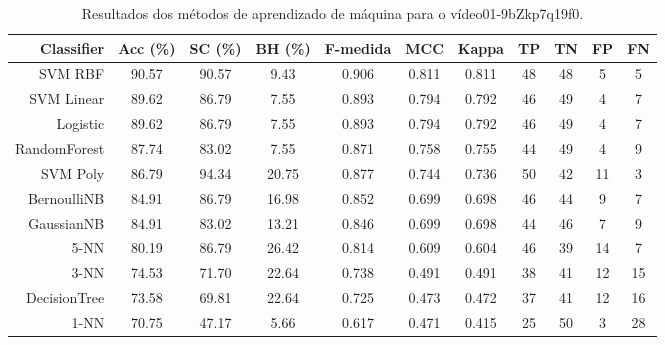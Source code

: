 \begin{table}[!htb]
\centering
\caption{Resultados dos métodos de aprendizado de máquina para o vídeo01-9bZkp7q19f0.}
\label{tab:01-9bZkp7q19f0}
\begin{tabular}{r|c|c|c|c|c|c|c|c|c|c}
\hline\hline
Classifier & Acc (\%) & SC (\%) & BH (\%) & F-medida & MCC & Kappa & TP & TN & FP & FN \\ \hline
SVM RBF & 90.57 & 90.57 & 9.43 & 0.906 & 0.811 & 0.811 & 48 & 48 & 5 & 5 \\ 
SVM Linear & 89.62 & 86.79 & 7.55 & 0.893 & 0.794 & 0.792 & 46 & 49 & 4 & 7 \\ 
Logistic & 89.62 & 86.79 & 7.55 & 0.893 & 0.794 & 0.792 & 46 & 49 & 4 & 7 \\ 
RandomForest & 87.74 & 83.02 & 7.55 & 0.871 & 0.758 & 0.755 & 44 & 49 & 4 & 9 \\ 
SVM Poly & 86.79 & 94.34 & 20.75 & 0.877 & 0.744 & 0.736 & 50 & 42 & 11 & 3 \\ 
BernoulliNB & 84.91 & 86.79 & 16.98 & 0.852 & 0.699 & 0.698 & 46 & 44 & 9 & 7 \\ 
GaussianNB & 84.91 & 83.02 & 13.21 & 0.846 & 0.699 & 0.698 & 44 & 46 & 7 & 9 \\ 
5-NN & 80.19 & 86.79 & 26.42 & 0.814 & 0.609 & 0.604 & 46 & 39 & 14 & 7 \\ 
3-NN & 74.53 & 71.70 & 22.64 & 0.738 & 0.491 & 0.491 & 38 & 41 & 12 & 15 \\ 
DecisionTree & 73.58 & 69.81 & 22.64 & 0.725 & 0.473 & 0.472 & 37 & 41 & 12 & 16 \\ 
1-NN & 70.75 & 47.17 & 5.66 & 0.617 & 0.471 & 0.415 & 25 & 50 & 3 & 28 \\ 
\hline\hline
\end{tabular}
\end{table}
